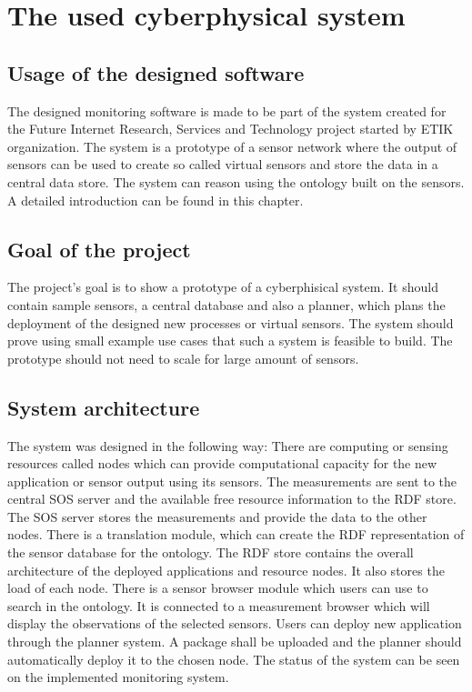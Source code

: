 \chapter{The used cyberphysical system}
\section{Usage of the designed software}

The designed monitoring software is made to be part of the system created for the Future Internet Research, Services and Technology project started by ETIK organization. The system is a prototype of a sensor network where the output of sensors can be used to create so called virtual sensors and store the data in a central data store. The system can reason using the ontology built on the sensors. A detailed introduction can be found in this chapter.

\section{Goal of the project}

The project's goal is to show a prototype of a cyberphisical system. It should contain sample sensors, a central database and also a planner, which plans the deployment of the designed new processes or virtual sensors. The system should prove using small example use cases that such a system is feasible to build. The prototype should not need to scale for large amount of sensors.

\section{System architecture}

The system was designed in the following way: 
There are computing or sensing resources called nodes which can provide computational capacity for the new application or sensor output using its sensors. The measurements are sent to the central SOS server and the available free resource information to the RDF store.
The SOS server stores the measurements and provide the data to the other nodes. There is a translation module, which can create the RDF representation of the sensor database for the ontology. 
The RDF store contains the overall architecture of the deployed applications and resource nodes. It also stores the load of each node. 
There is a sensor browser module which users can use to search in the ontology. It is connected to a measurement browser which will display the observations of the selected sensors. 
Users can deploy new application through the planner system. A package shall be uploaded and the planner should automatically deploy it to the chosen node. 
The status of the system can be seen on the implemented monitoring system.

